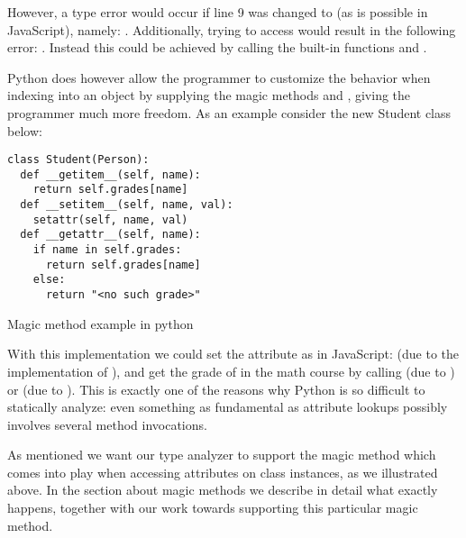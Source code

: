 
However, a type error would occur if line 9 was changed to  (as is possible in JavaScript), namely: 
. Additionally, trying to access  would result in the following error: . Instead this could be achieved by calling the built-in functions  and .

Python does however allow the programmer to customize the behavior when indexing into an object by supplying the magic methods
 and , giving the programmer much more freedom. As an example consider the new Student class below:

\begin{listing}[H]
\begin{verbatim}
class Student(Person):
  def __getitem__(self, name):
    return self.grades[name]
  def __setitem__(self, name, val):
    setattr(self, name, val)
  def __getattr__(self, name):
    if name in self.grades:
      return self.grades[name]
    else:
      return "<no such grade>"
\end{verbatim}
	\caption{Magic method example in python}
	\label{code:Features2}
\end{listing}

With this implementation we could set the  attribute as in JavaScript:  (due to the implementation of ), and get the grade of  in the math course by calling  (due to ) or  (due to ). This is exactly one of the reasons why Python is so difficult to statically analyze: even something as fundamental as attribute lookups possibly involves several method invocations.

As mentioned we want our type analyzer to support the magic method  which comes into play when accessing attributes on class instances, as we illustrated above. In the section about magic methods we describe in detail what exactly happens, together with our work towards supporting this particular magic method.